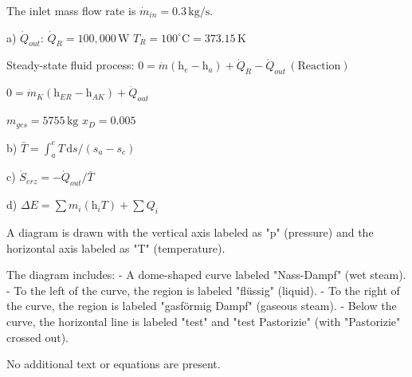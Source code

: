 The inlet mass flow rate is \( \dot{m}_{in} = 0.3 \, \text{kg/s} \).  

a) \( \dot{Q}_{out} \):  
\( \dot{Q}_R = 100,000 \, \text{W} \)  
\( T_R = 100^\circ \text{C} = 373.15 \, \text{K} \)  

Steady-state fluid process:  
\( 0 = \dot{m} (\text{h}_e - \text{h}_a) + \dot{Q}_R - \dot{Q}_{out} \, (\text{Reaction}) \)  

\( 0 = \dot{m}_K (\text{h}_{ER} - \text{h}_{AK}) + \dot{Q}_{out} \)  

\( m_{ges} = 5755 \, \text{kg} \)  
\( x_D = 0.005 \)  

b)  
\( \bar{T} = \int_a^c T \, \text{d}s / (s_a - s_c) \)  

c)  
\( \dot{S}_{erz} = - \dot{Q}_{out} / \bar{T} \)  

d)  
\( \Delta E = \sum m_i (\text{h}_i T) + \sum Q_i \)

A diagram is drawn with the vertical axis labeled as "p" (pressure) and the horizontal axis labeled as "T" (temperature).  

The diagram includes:  
- A dome-shaped curve labeled "Nass-Dampf" (wet steam).  
- To the left of the curve, the region is labeled "flüssig" (liquid).  
- To the right of the curve, the region is labeled "gasförmig Dampf" (gaseous steam).  
- Below the curve, the horizontal line is labeled "test" and "test Pastorizie" (with "Pastorizie" crossed out).  

No additional text or equations are present.
